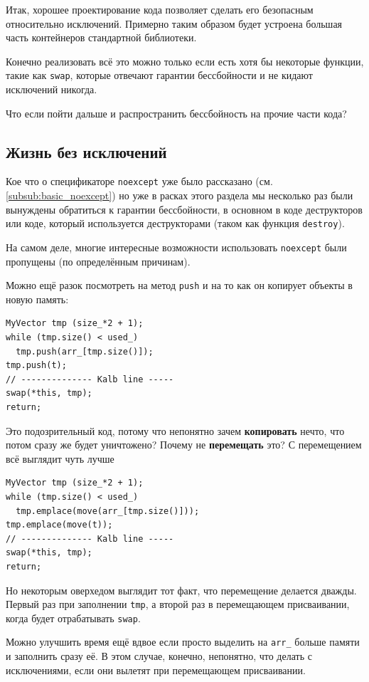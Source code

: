 \documentclass[a4paper,12pt,oneside]{book}
\begin{document}
Итак, хорошее проектирование кода позволяет сделать его безопасным относительно исключений. Примерно таким образом будет устроена большая часть контейнеров стандартной библиотеки.

Конечно реализовать всё это можно только если есть хотя бы некоторые функции, такие как \lstinline!swap!, которые отвечают гарантии бессбойности и не кидают исключений никогда.

Что если пойти дальше и распространить бессбойность на прочие части кода?

\subsection{Жизнь без исключений}\label{subsub:noexcept}

Кое что о спецификаторе \lstinline!noexcept! уже было рассказано (см. \ref{subsub:basic_noexcept}) но уже в расках этого раздела мы несколько раз были вынуждены обратиться к гарантии бессбойности, в основном в коде деструкторов или коде, который используется деструкторами (таком как функция \lstinline!destroy!).

На самом деле, многие интересные возможности использовать \lstinline!noexcept! были пропущены (по определённым причинам).

Можно ещё разок посмотреть на метод \lstinline!push! и на то как он копирует объекты в новую память:

\begin{lstlisting}
MyVector tmp (size_*2 + 1);
while (tmp.size() < used_)
  tmp.push(arr_[tmp.size()]);
tmp.push(t);
// -------------- Kalb line -----
swap(*this, tmp);
return;
\end{lstlisting}

Это подозрительный код, потому что непонятно зачем \textbf{копировать} нечто, что потом сразу же будет уничтожено? Почему не \textbf{перемещать} это? С перемещением всё выглядит чуть лучше

\begin{lstlisting}
MyVector tmp (size_*2 + 1);
while (tmp.size() < used_)
  tmp.emplace(move(arr_[tmp.size()]));
tmp.emplace(move(t));
// -------------- Kalb line -----
swap(*this, tmp);
return;
\end{lstlisting}

Но некоторым оверхедом выглядит тот факт, что перемещение делается дважды. Первый раз при заполнении \lstinline!tmp!, а второй раз в перемещающем присваивании, когда будет отрабатывать \lstinline!swap!.

Можно улучшить время ещё вдвое если просто выделить на \lstinline!arr_! больше памяти и заполнить сразу её. В этом случае, конечно, непонятно, что делать с исключениями, если они вылетят при перемещающем присваивании.
\end{document}
